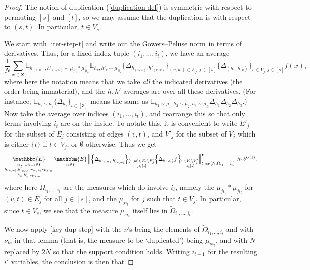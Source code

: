 \documentclass[11pt,reqno]{amsart}
\numberwithin{equation}{section}
\theoremstyle{definition}
\theoremstyle{remark}
\newcommand{\mb}{\mathbb}
\newcommand{\mbm}{\mathbbm}
\newcommand\Z{\mathbf{Z}}
\newcommand\E{\mb{E}}
\DeclareMathOperator*{\bigavg}{\scalerel*{\mbm{E}}{(}}
\newcommand\GP{\operatorname{GP}}
\begin{document}
\begin{proof}
The notion of duplication (\cref{duplication-def}) is symmetric with respect to permuting $[s]$ and $[t]$, so we may assume that the duplication is with respect to $(s,t)$. In particular, $t \in V_s$.

We start with \cref{iter-step-t} and write out the Gowers--Peluse norm in terms of derivatives. Thus, for a fixed index tuple $(i_1,\dots, i_t)$, we have an average 
\[ \frac{1}{N} \sum_{x \in \Z} \E_{h_{(v,w)}, h'_{(v,w)} \sim \mu_{ji_v} \ast \mu_{ji_w}} \E_{h_v, h'_v \sim \mu_{j i_v}}  \big\{ \Delta_{h_{(v,w)}, h'_{(v,w)}} \big\}_{(v,w) \in E_j, j \in [s]}  \big\{ \Delta_{(h_v, h'_v)}\big\}_{v \in V_j , j \in [s]} f(x),\] where here the notation means that we take \emph{all} the indicated derivatives (the order being immaterial), and the $h, h'$-averages are over all these derivatives. (For instance, $\E_{h_i \sim \mu_i} \{ \Delta_{h_i} \}_{i \in [3]}$ means the same as $\E_{h_1 \sim \mu_1, h_2 \sim \mu_2, h_3 \sim \mu_3} \Delta_{h_1}\Delta_{h_2}\Delta_{h_3}$.) Now take the average over indices $(i_1,\dots, i_t)$, and rearrange this so that only terms involving $i_t$ are on the inside. To notate this, it is convenient to write $E'_j$ for the subset of $E_j$ consisting of edges $(v,t)$, and $V'_j$ for the subset of $V_j$ which is either $\{t\}$ if $t \in V_j$, or $\emptyset$ otherwise. Thus we get
\[ \bigavg_{\substack{i_1,\dots, i_{t-1} \in I \\ h_{(v,w)}, h'_{(v,w)} \sim \mu_{ji_v} \ast \mu_{ji_w} \\ h_v, h'_v \sim \mu_{j i_v}}}  \bigavg_{i_t \in I} \Big\Vert  \Big\{ \Delta_{h_{(v,w)}, h'_{(v,w)}} \Big\}_{\substack{(v,w) \in E_j\setminus E'_j \\ j \in [s]}} \Big\{ \Delta_{h_v, h'_v} f \Big\}_{\substack{v \in V_j \setminus V'_j \\ j \in [s]}}\Big\Vert^{\bullet}_{U_{\GP}[N; \tilde \Omega_{i_1,\dots, i_t}]} \gg \delta^{O(1)}, \]
where here $\tilde\Omega_{i_1,\dots, i_t}$ are the measures which do involve $i_t$, namely the $\mu_{ji_v} \ast \mu_{ji_t}$ for $(v,t) \in E_j$ for all $j \in [s]$, and the $\mu_{ji_t}$ for $j$ such that $t \in V_j$. In particular, since $t \in V_s$, we see that the measure $\mu_{si_t}$ itself lies in $\tilde\Omega_{i_1,\dots, i_t}$.

We now apply \cref{key-dup-step} with the $\nu$'s being the elements of $\tilde\Omega_{i_1,\dots, i_t}$ and with $\nu_{ki}$ in that lemma (that is, the measure to be `duplicated') being  $\mu_{si_t}$, and with $N$ replaced by $2N$ so that the support condition holds. Writing $i_{t+1}$ for the resulting $i'$ variables, the conclusion is then that 


\end{proof}
\end{document}
